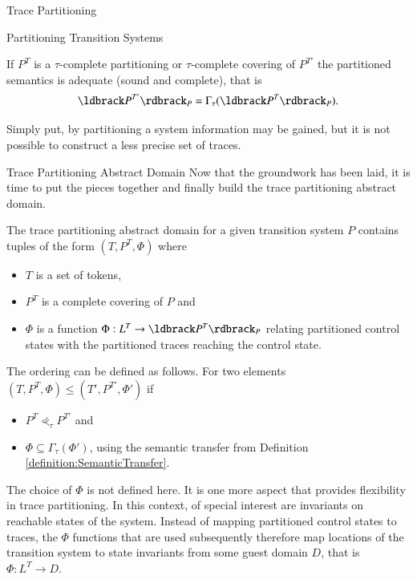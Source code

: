 \begin{chapter}{Trace Partitioning}
\begin{section}{Partitioning Transition Systems}
		\begin{theorem}
			If $P^T$ is a $\tau$-complete partitioning or $\tau$-complete covering of $P^{T'}$ the partitioned semantics is adequate (sound and complete), that is
			\begin{equation}
				\partitioned{P^{T'}} = \Gamma_\tau(\partitioned{P^T}).
			\end{equation}
		\end{theorem}

		Simply put, by partitioning a system information may be gained, but it is not possible to construct a less precise set of traces.

	\end{section}


	\begin{section}{Trace Partitioning Abstract Domain}
		Now that the groundwork has been laid, it is time to put the pieces together and finally build the trace partitioning abstract domain.

		\begin{definition}
			The trace partitioning abstract domain for a given transition system $P$ contains tuples of the form $(T, P^T, \Phi)$ where
			\begin{itemize}
				\item $T$ is a set of tokens,
				\item $P^T$ is a complete covering of $P$ and
				\item $\Phi$ is a function $\Phi: L^T \to \partitioned{P^T}$ relating partitioned control states with the partitioned traces reaching the control state.
			\end{itemize}
			The ordering can be defined as follows. For two elements $(T, P^T, \Phi) \leq (T', P^{T'}, \Phi')$ if
			\begin{itemize}
				\item $P^T \curlyeqprec_\tau P^{T'}$ and
				\item $\Phi \subseteq \Gamma_\tau(\Phi')$, using the semantic transfer from Definition \ref{definition:SemanticTransfer}.
			\end{itemize}
		\end{definition}

		The choice of $\Phi$ is not defined here. It is one more aspect that provides flexibility in trace partitioning. In this context, of special interest are invariants on reachable states of the system. Instead of mapping partitioned control states to traces, the $\Phi$ functions that are used subsequently therefore map locations of the transition system to state invariants from some guest domain $D$, that is $\Phi: L^T \to D$.


\end{section}
\end{chapter}
